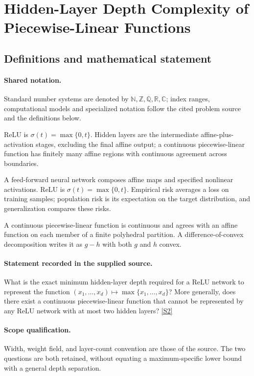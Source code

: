 \documentclass[11pt]{article}
\newcommand{\sref}[2]{\hyperlink{source:#1:#2}{[S#2]}}
\begin{document}
\section{Hidden-Layer Depth Complexity of Piecewise-Linear Functions}\label{statement}

\subsection{Definitions and mathematical statement}

\paragraph{Shared notation.}Standard number systems are denoted by $\mathbb N,\mathbb Z,\mathbb Q,\mathbb R,\mathbb C$; index ranges, computational models and specialized notation follow the cited problem source and the definitions below.


ReLU is $\sigma(t)=\max\{0,t\}$. Hidden layers are the intermediate affine-plus-activation stages, excluding the final affine output; a continuous piecewise-linear function has finitely many affine regions with continuous agreement across boundaries.

A feed-forward neural network composes affine maps and specified nonlinear activations. ReLU is $\sigma(t)=\max\{0,t\}$. Empirical risk averages a loss on training samples; population risk is its expectation on the target distribution, and generalization compares these risks.

A continuous piecewise-linear function is continuous and agrees with an affine function on each member of a finite polyhedral partition. A difference-of-convex decomposition writes it as $g-h$ with both $g$ and $h$ convex.
\paragraph{Statement recorded in the supplied source.}
What is the exact minimum hidden-layer depth required for a ReLU network to represent the function $(x_1,\ldots,x_d)\mapsto\max\{x_1,\ldots,x_d\}$? More generally, does there exist a continuous piecewise-linear function that cannot be represented by any ReLU network with at most two hidden layers? \sref{statement}{2}
\paragraph{Scope qualification.}
Width, weight field, and layer-count convention are those of the source. The two questions are both retained, without equating a maximum-specific lower bound with a general depth separation.
\end{document}
